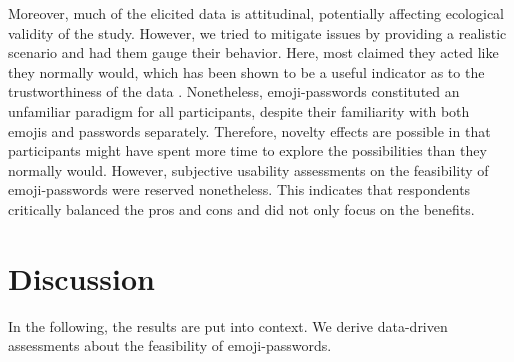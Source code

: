 Moreover, much of the elicited data is attitudinal, potentially affecting ecological validity of the study. However, we tried to mitigate issues by providing a realistic scenario and had them gauge their behavior. Here, most claimed they acted like they normally would, which has been shown to be a useful indicator as to the trustworthiness of the data \cite{Fahl2013EcologicalValidityPasswordStudy}. Nonetheless, emoji-passwords constituted an unfamiliar paradigm for all participants, despite their familiarity with both emojis and passwords separately. Therefore, novelty effects are possible in that participants might have spent more time to explore the possibilities than they normally would. However, subjective usability assessments on the feasibility of emoji-passwords were reserved nonetheless. This indicates that respondents critically balanced the pros and cons and did not only focus on the benefits.


\section{Discussion}
In the following, the results are put into context. We derive data-driven assessments about the feasibility of emoji-passwords. 
